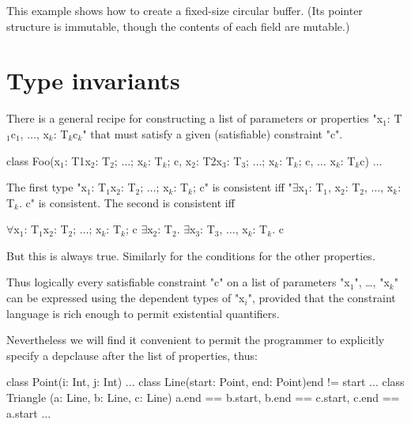 \begin{example}
This example shows how to create a fixed-size circular buffer.
(Its pointer structure is immutable, though the contents of each
field are mutable.)
\end{example}


\section{Type invariants}\label{DepType:ClassGuard}

There is a general recipe for constructing a list of parameters or
properties \xcdmath"x$_1$: T$_1${c$_1$}, $\dots$, x$_k$: T$_k${c$_k$}" that must satisfy a given
(satisfiable) constraint \xcd"c". 

\begin{xtenmath}
class Foo(x$_1$: T1{x$_2$: T$_2$; $\dots$; x$_k$: T$_k$; c},
          x$_2$: T2{x$_3$: T$_3$; $\dots$; x$_k$: T$_k$; c},
          $\dots$
          x$_k$: T$_k${c}) {
  $\dots$
}
\end{xtenmath}

The first type \xcdmath"x$_1$: T$_1${x$_2$: T$_2$; $\dots$; x$_k$: T$_k$; c}" is consistent iff
\xcdmath"$\exists$x$_1$: T$_1$, x$_2$: T$_2$, $\dots$, x$_k$: T$_k$. c" is consistent. The second is
consistent iff
\begin{xtenmath}
$\forall$x$_1$: T$_1${x$_2$: T$_2$; $\dots$; x$_k$: T$_k$; c}
$\exists$x$_2$: T$_2$. $\exists$x$_3$: T$_3$, $\dots$, x$_k$: T$_k$. c
\end{xtenmath}
\noindent But this is always true. Similarly for the conditions for the other
properties.

Thus logically every satisfiable constraint \xcd"c" on a list of parameters
\xcdmath"x$_1$", \dots, \xcdmath"x$_k$"
can be expressed using the dependent types of 
\xcdmath"x$_i$", provided
that the constraint language is rich enough to permit existential
quantifiers.

Nevertheless we will find it convenient to permit the programmer to
explicitly specify a depclause after the list of properties, thus:
\begin{xten}
class Point(i: Int, j: Int) { ... }
class Line(start: Point, end: Point){end != start} { ... }
class Triangle (a: Line, b: Line, c: Line)
   {a.end == b.start,  b.end == c.start,
    c.end == a.start} { ... }
\end{xten}

